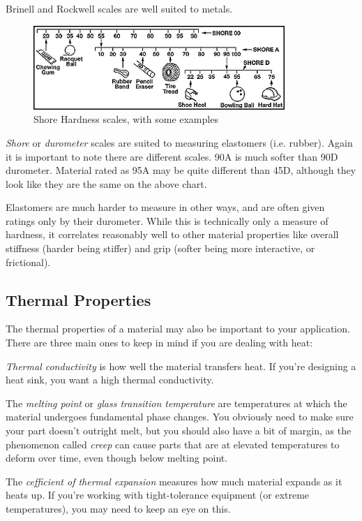 \documentclass[10pt,letterpaper]{book}
\begin{document}
 Brinell and Rockwell scales are well suited to metals.
 
 \begin{figure}[H]
 	\includegraphics[width=0.85\textwidth]{imgs/shore_hardness.jpeg}
 	\caption{Shore Hardness scales, with some examples}
 \end{figure}
 
 \textit{Shore} or \textit{durometer} scales are suited to measuring elastomers (i.e. rubber). Again it is important to note there are different scales. 90A is much softer than 90D durometer. Material rated as 95A may be quite different than 45D, although they look like they are the same on the above chart.
 
 Elastomers are much harder to measure in other ways, and are often given ratings only by their durometer. While this is technically only a measure of hardness, it correlates reasonably well to other material properties like overall stiffness (harder being stiffer) and grip (softer being more interactive, or frictional).
 
 \subsection{Thermal Properties}
 
 The thermal properties of a material may also be important to your application. There are three main ones to keep in mind if you are dealing with heat:
 \begin{asparaitem}
 	\item \textit{Thermal conductivity} is how well the material transfers heat. If you're designing a heat sink, you want a high thermal conductivity.
 	\item The \textit{melting point} or \textit{glass transition temperature} are temperatures at which the material undergoes fundamental phase changes. You obviously need to make sure your part doesn't outright melt, but you should also have a bit of margin, as the phenomenon called \textit{creep} can cause parts that are at elevated temperatures to deform over time, even though below melting point.
 	\item The \textit{cefficient of thermal expansion} measures how much material expands as it heats up. If you're working with tight-tolerance equipment (or extreme temperatures), you may need to keep an eye on this.
 \end{asparaitem}
  
\end{document}
